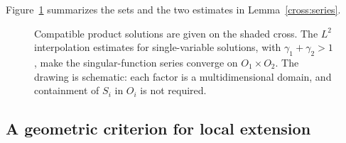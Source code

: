 Figure~\ref{cross:figure} summarizes the sets and the two estimates in
Lemma~\ref{cross:series}.
\begin{figure}[htbp]
 \centering
 
 \caption{Compatible product solutions are given on the shaded cross.
 The $L^2$ interpolation estimates for single-variable solutions,
 with $\gamma_1+\gamma_2>1$, make the
 singular-function series converge on $O_1\times O_2$.
 The drawing is schematic: each factor is a multidimensional domain,
 and containment of $S_i$ in $O_i$ is not required.}
 \label{cross:figure}
\end{figure}

\subsection{A geometric criterion for local extension}

